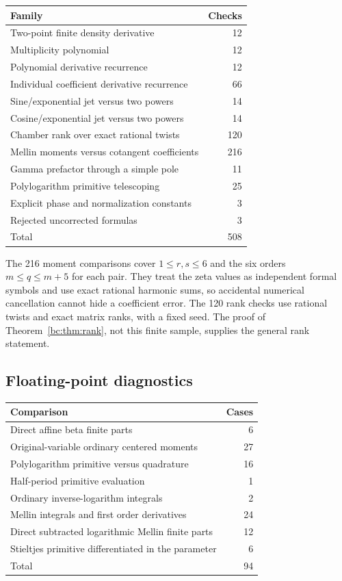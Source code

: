 \documentclass[11pt,letterpaper]{article}
\numberwithin{equation}{section}
\theoremstyle{definition}
\theoremstyle{remark}
\begin{document}
\begin{center}
\begin{tabular}{lr}
\toprule
Family & Checks\\
\midrule
Two-point finite density derivative &12\\
Multiplicity polynomial &12\\
Polynomial derivative recurrence &12\\
Individual coefficient derivative recurrence &66\\
Sine/exponential jet versus two powers &14\\
Cosine/exponential jet versus two powers &14\\
Chamber rank over exact rational twists &120\\
Mellin moments versus cotangent coefficients &216\\
Gamma prefactor through a simple pole &11\\
Polylogarithm primitive telescoping &25\\
Explicit phase and normalization constants &3\\
Rejected uncorrected formulas &3\\
\midrule
Total &508\\
\bottomrule
\end{tabular}
\end{center}

The 216 moment comparisons cover $1\le r,s\le6$ and the six orders
$m\le q\le m+5$ for each pair. They treat the zeta values as independent
formal symbols and use exact rational harmonic sums, so accidental
numerical cancellation cannot hide a coefficient error. The 120 rank
checks use rational twists and exact matrix ranks, with a fixed seed.
The proof of Theorem~\ref{bc:thm:rank}, not this finite sample, supplies
the general rank statement.

\subsection{Floating-point diagnostics}

\begin{center}
\begin{tabular}{lr}
\toprule
Comparison & Cases\\
\midrule
Direct affine beta finite parts &6\\
Original-variable ordinary centered moments &27\\
Polylogarithm primitive versus quadrature &16\\
Half-period primitive evaluation &1\\
Ordinary inverse-logarithm integrals &2\\
Mellin integrals and first order derivatives &24\\
Direct subtracted logarithmic Mellin finite parts &12\\
Stieltjes primitive differentiated in the parameter &6\\
\midrule
Total &94\\
\bottomrule
\end{tabular}
\end{center}
\end{document}
